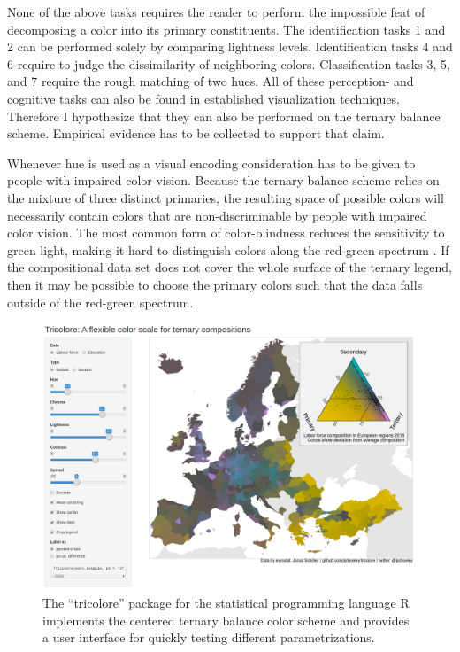 \documentclass[10pt, twoside, parskip=half]{article}
\makeatletter
\def\maxwidth{\ifdim\Gin@nat@width>\linewidth\linewidth
\else\Gin@nat@width\fi}
\let\Oldincludegraphics\includegraphics
\renewcommand{\includegraphics}[1]{\Oldincludegraphics[width=\maxwidth]{#1}}
\makeatother
\begin{document}
None of the above tasks requires the reader to perform the impossible
feat of decomposing a color into its primary constituents. The
identification tasks 1 and 2 can be performed solely by comparing
lightness levels. Identification tasks 4 and 6 require to judge the
dissimilarity of neighboring colors. Classification tasks 3, 5, and 7
require the rough matching of two hues. All of these perception- and
cognitive tasks can also be found in established visualization
techniques. Therefore I hypothesize that they can also be performed on
the ternary balance scheme. Empirical evidence has to be collected to
support that claim.

Whenever hue is used as a visual encoding consideration has to be given
to people with impaired color vision. Because the ternary balance scheme
relies on the mixture of three distinct primaries, the resulting space
of possible colors will necessarily contain colors that are
non-discriminable by people with impaired color vision. The most common
form of color-blindness reduces the sensitivity to green light, making
it hard to distinguish colors along the red-green spectrum
\citep{Birch2012}. If the compositional data set does not cover the
whole surface of the ternary legend, then it may be possible to choose
the primary colors such that the data falls outside of the red-green
spectrum.

\begin{figure}
\centering
\includegraphics{figure4.png}
\caption{The ``tricolore'' package for the statistical programming
language R implements the centered ternary balance color scheme and
provides a user interface for quickly testing different
parametrizations.}
\end{figure}
\end{document}
